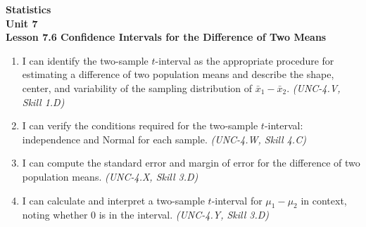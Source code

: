 \documentclass[10pt]{article}
\begin{document}
\vspace{-0.8in}

\begin{center}
  {\color{white}\textbf{\LARGE Statistics}}\\[4pt]
  {\color{skymid}\large\textbf{Unit 7}}\\[6pt]
  {\color{white}\textbf{\large Lesson 7.6 \quad Confidence Intervals for the Difference of Two Means}}
\end{center}

\vspace{0.22in}
\namedateperiod
\vspace{0.18in}

\begin{learningtargetbox}
\small
\begin{enumerate}[leftmargin=1.5em, itemsep=5pt]
  \item I can identify the two-sample $t$-interval as the appropriate procedure for
        estimating a difference of two population means and describe the shape, center,
        and variability of the sampling distribution of $\bar x_1 - \bar x_2$.
        \textit{(UNC-4.V, Skill 1.D)}
  \item I can verify the conditions required for the two-sample $t$-interval:
        independence and Normal for each sample.
        \textit{(UNC-4.W, Skill 4.C)}
  \item I can compute the standard error and margin of error for the difference of
        two population means.
        \textit{(UNC-4.X, Skill 3.D)}
  \item I can calculate and interpret a two-sample $t$-interval for $\mu_1 - \mu_2$
        in context, noting whether 0 is in the interval.
        \textit{(UNC-4.Y, Skill 3.D)}
\end{enumerate}
\end{learningtargetbox}

\vspace{0.14in}
\end{document}
